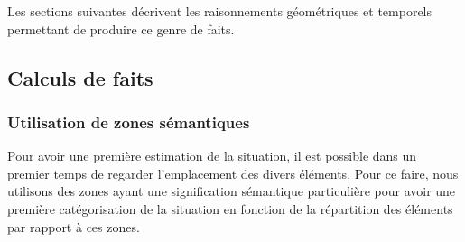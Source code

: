 \documentclass[a4paper,11pt,twoside]{StyleThese}
\begin{document}
Les sections suivantes décrivent les raisonnements géométriques et temporels 
permettant de produire ce genre de faits.

\subsection{Calculs de faits}


\subsubsection{Utilisation de zones sémantiques}
\label{sec:zones}

Pour avoir une première estimation de la situation, il est possible dans un premier temps de regarder l'emplacement des divers éléments. Pour ce faire, nous utilisons des zones ayant une signification sémantique particulière pour avoir une première catégorisation de la situation en fonction de la répartition des éléments par rapport à ces zones.
\end{document}
